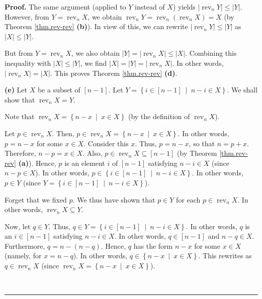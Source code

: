 \documentclass[numbers=enddot,12pt,final,onecolumn,notitlepage]{scrartcl}%
\theoremstyle{definition}
\newenvironment{proof}[1][Proof]{\noindent\textbf{#1.} }{\ \rule{0.5em}{0.5em}}
\begin{document}
\begin{proof}
The same argument (applied to $Y$ instead of $X$) yields $\left\vert
\operatorname*{rev}\nolimits_{n}Y\right\vert \leq\left\vert Y\right\vert $.
However, from $Y=\operatorname*{rev}\nolimits_{n}X$, we obtain
$\operatorname*{rev}\nolimits_{n}Y=\operatorname*{rev}\nolimits_{n}\left(
\operatorname*{rev}\nolimits_{n}X\right)  =X$ (by Theorem \ref{thm.rev-rev}
\textbf{(b)}). In view of this, we can rewrite $\left\vert \operatorname*{rev}%
\nolimits_{n}Y\right\vert \leq\left\vert Y\right\vert $ as $\left\vert
X\right\vert \leq\left\vert Y\right\vert $.

But from $Y=\operatorname*{rev}\nolimits_{n}X$, we also obtain $\left\vert
Y\right\vert =\left\vert \operatorname*{rev}\nolimits_{n}X\right\vert
\leq\left\vert X\right\vert $. Combining this inequality with $\left\vert
X\right\vert \leq\left\vert Y\right\vert $, we find $\left\vert X\right\vert
=\left\vert Y\right\vert =\left\vert \operatorname*{rev}\nolimits_{n}%
X\right\vert $. In other words, $\left\vert \operatorname*{rev}\nolimits_{n}%
X\right\vert =\left\vert X\right\vert $. This proves Theorem \ref{thm.rev-rev}
\textbf{(d)}. \medskip

\textbf{(e)} Let $X$ be a subset of $\left[  n-1\right]  $. Let $Y=\left\{
i\in\left[  n-1\right]  \ \mid\ n-i\in X\right\}  $. We shall show that
$\operatorname*{rev}\nolimits_{n}X=Y$.

Note that $\operatorname*{rev}\nolimits_{n}X=\left\{  n-x\ \mid\ x\in
X\right\}  $ (by the definition of $\operatorname*{rev}\nolimits_{n}X$).

Let $p\in\operatorname*{rev}\nolimits_{n}X$. Then, $p\in\operatorname*{rev}%
\nolimits_{n}X=\left\{  n-x\ \mid\ x\in X\right\}  $. In other words, $p=n-x$
for some $x\in X$. Consider this $x$. Thus, $p=n-x$, so that $n=p+x$.
Therefore, $n-p=x\in X$. Also, $p\in\operatorname*{rev}\nolimits_{n}%
X\subseteq\left[  n-1\right]  $ (by Theorem \ref{thm.rev-rev} \textbf{(a)}).
Hence, $p$ is an element $i$ of $\left[  n-1\right]  $ satisfying $n-i\in X$
(since $n-p\in X$). In other words, $p\in\left\{  i\in\left[  n-1\right]
\ \mid\ n-i\in X\right\}  $. In other words, $p\in Y$ (since $Y=\left\{
i\in\left[  n-1\right]  \ \mid\ n-i\in X\right\}  $).

Forget that we fixed $p$. We thus have shown that $p\in Y$ for each
$p\in\operatorname*{rev}\nolimits_{n}X$. In other words, $\operatorname*{rev}%
\nolimits_{n}X\subseteq Y$.

Now, let $q\in Y$. Thus, $q\in Y=\left\{  i\in\left[  n-1\right]
\ \mid\ n-i\in X\right\}  $. In other words, $q$ is an $i\in\left[
n-1\right]  $ satisfying $n-i\in X$. In other words, $q\in\left[  n-1\right]
$ and $n-q\in X$. Furthermore, $q=n-\left(  n-q\right)  $. Hence, $q$ has the
form $n-x$ for some $x\in X$ (namely, for $x=n-q$). In other words,
$q\in\left\{  n-x\ \mid\ x\in X\right\}  $. This rewrites as $q\in
\operatorname*{rev}\nolimits_{n}X$ (since $\operatorname*{rev}\nolimits_{n}%
X=\left\{  n-x\ \mid\ x\in X\right\}  $).


\end{proof}
\end{document}
